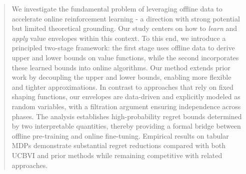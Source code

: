 \documentclass[twoside]{article}
\begin{document}
\begin{abstract}
We investigate the fundamental problem of leveraging offline data to accelerate online reinforcement learning - a direction with strong potential but limited theoretical grounding. Our study centers on how to \emph{learn} and \emph{apply} value envelopes within this context. To this end, we introduce a principled two-stage framework: the first stage uses offline data to derive upper and lower bounds on value functions, while the second incorporates these learned bounds into online algorithms. Our method extends prior work by decoupling the upper and lower bounds, enabling more flexible and tighter approximations. In contrast to approaches that rely on fixed shaping functions, our envelopes are data-driven and explicitly modeled as random variables, with a filtration argument ensuring independence across phases. The analysis establishes high-probability regret bounds determined by two interpretable quantities, thereby providing a formal bridge between offline pre-training and online fine-tuning. Empirical results on tabular MDPs demonstrate substantial regret reductions compared with both UCBVI and prior methods while remaining competitive with related approaches.





\end{abstract}
\end{document}
